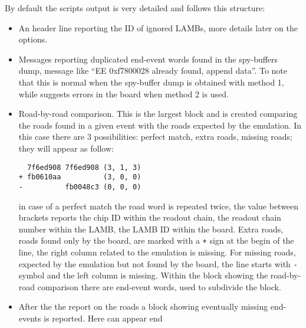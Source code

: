 By default the scripts output is very detailed and follows this structure:
\begin{itemize}
	\item An header line reporting the ID of ignored LAMBs, more details 
	later on the options.
	
	\item Messages reporting duplicated end-event words found in the spy-buffers
	dump, message like ``EE 0xf7800028 already found, append data''.
	To note that this is normal when the spy-buffer dump is obtained with method
	1, while suggests errors in the board when method 2 is used.
	
	\item Road-by-road comparison. This is the largest block and is created 
	comparing the roads found in a given event with the roads expected by the
	emulation. In this case there are 3 possibilities: perfect match, 
	extra roads,
	missing roads; they will appear as follow:
\begin{verbatim}
  7f6ed908 7f6ed908 (3, 1, 3)
+ fb0610aa          (3, 0, 0)
-          fb0048c3 (0, 0, 0)
\end{verbatim}	
	in case of a perfect match the road word is repeated twice, the value
	between brackets reports the chip ID within the readout chain, the readout
	chain number within the LAMB, the LAMB ID within the board. Extra roads, 
	roads found only by the board, are marked with a \texttt{+} sign at the
	begin of the line, the right column related to the emulation is missing.
	For missing roads, expected by the emulation but not found by the board,
	the line starts with \texttt{-} symbol and the left column is missing.
	Within the block showing the road-by-road comparison there are end-event
	words, used to subdivide the block.
	
	\item After the the report on the roads a block showing eventually missing
	end-events is reported. Here can appear end
\end{itemize}